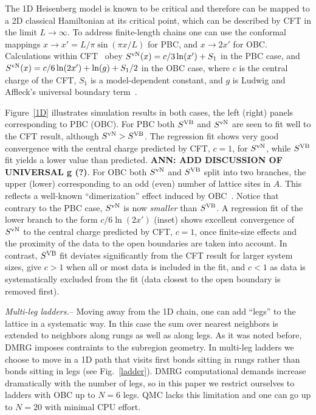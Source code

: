 \documentclass[prl,aps,twocolumn,floatfix,amsmath,amssymb,superscriptaddress,tightenlines]{revtex4}
\begin{document}
The 1D Heisenberg model is known to be critical and therefore can be
mapped to a 2D classical Hamiltonian at its critical point, which
can be described by CFT in the limit $L\to\infty$.  To address
finite-length chains one can use the conformal mappings $x\to x'=L/\pi
\sin(\pi x / L)$ for PBC, and 
$x\to 2x'$ for OBC. %
Calculations within CFT~\cite{Cardy} obey $S^{\rm vN}(x)= c/3
\ln(x') + S_1$ in the PBC case, and $S^{\rm vN}(x)= c/6 \ln(2x') +
\ln(g)+S_1/2$ in the OBC case, where $c$ is the central charge of the CFT,
$S_1$ is a model-dependent constant, and $g$ is Ludwig and Affleck's
universal boundary term~\cite{AffleckAndLudwig}.

Figure~\ref{1D} illustrates simulation results in both cases, the left
(right) panels corresponding to PBC (OBC). 
For PBC both
$S^{\rm VB}$ and $S^{ \rm vN}$ are seen to fit well to the CFT result, although
$S^{ \rm vN} > S^{\rm VB}$. The regression fit shows very good
convergence with the central charge predicted by CFT, $c=1$, for $S^{ \rm vN}$, while
$S^{\rm VB}$ fit yields a lower value than predicted.
{\bf ANN: ADD DISCUSSION OF UNIVERSAL g (?)}.  
For OBC both $S^{ \rm vN}$ and $S^{\rm VB}$ split into two branches, the upper (lower)
corresponding to an odd (even) number of lattice sites in $A$.  This
reflects a well-known ``dimerization'' effect induced by OBC~\cite{Ian1}.
Notice that contrary to the PBC case, $S^{ \rm vN}$ is now \textit{smaller}
than $S^{\rm VB}$. A regression fit of the lower branch to the form $c/6 \ln
({2x'})$ (inset) shows excellent convergence of $S^{ \rm vN}$ to the central
charge predicted by CFT, $c=1$, once finite-size effects and the proximity
of the data to the open boundaries are taken into account.  In contrast,
$S^{\rm VB}$ fit deviates significantly from the CFT result for larger system
sizes, give $c>1$ when all or most data is included in the fit, and $c<1$
as data is systematically excluded from the fit (data closest to the open
boundary is removed first).

{\it Multi-leg ladders.}-- Moving away from the 1D chain, one can add
``legs'' to the lattice in a systematic way. In this case the sum over
nearest neighbors is extended to neighbors along rungs as well as along
legs.  As it was noted before, DMRG imposes contraints to the subregion
geometry. In multi-leg ladders we choose to move in a 1D path that visits
first bonds sitting in rungs rather than bonds sitting in legs (see
Fig.~\ref{ladder}).  DMRG computational demands increase dramatically with
the number of legs, so in this paper we restrict ourselves to ladders with
OBC up to $N=6$ legs. QMC lacks this limitation and one can go up to
$N=20$ with minimal CPU effort.
\end{document}
